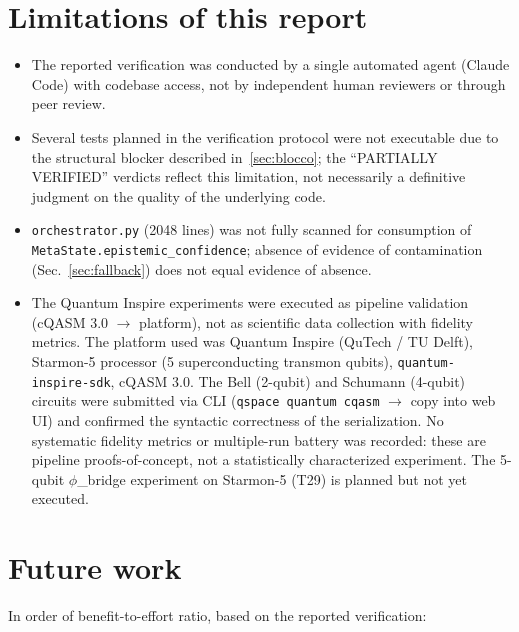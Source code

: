 \documentclass[11pt,a4paper]{article}
\newcommand{\code}[1]{\texttt{#1}}
\newcommand{\starmon}{Starmon-5\xspace}
\begin{document}
\section{Limitations of this report}
\label{sec:limits}

\begin{itemize}
  \item The reported verification was conducted by a single automated agent (Claude Code) with codebase access, not by independent human reviewers or through peer review.
  \item Several tests planned in the verification protocol were not executable due to the structural blocker described in~\ref{sec:blocco}; the ``PARTIALLY VERIFIED'' verdicts reflect this limitation, not necessarily a definitive judgment on the quality of the underlying code.
  \item \code{orchestrator.py} (2048 lines) was not fully scanned for consumption of \code{MetaState.epistemic\_confidence}; absence of evidence of contamination (Sec.~\ref{sec:fallback}) does not equal evidence of absence.
  \item The Quantum Inspire experiments were executed as pipeline validation (cQASM 3.0 $\to$ platform), not as scientific data collection with fidelity metrics. The platform used was Quantum Inspire (QuTech / TU Delft), \starmon{} processor (5 superconducting transmon qubits), \code{quantum-inspire-sdk}, cQASM 3.0. The Bell (2-qubit) and Schumann (4-qubit) circuits were submitted via CLI (\code{qspace quantum cqasm} $\to$ copy into web UI) and confirmed the syntactic correctness of the serialization. No systematic fidelity metrics or multiple-run battery was recorded: these are pipeline proofs-of-concept, not a statistically characterized experiment. The 5-qubit $\phi$\_bridge experiment on \starmon{} (T29) is planned but not yet executed.
\end{itemize}

\section{Future work}
\label{sec:future}

In order of benefit-to-effort ratio, based on the reported verification:
\end{document}
